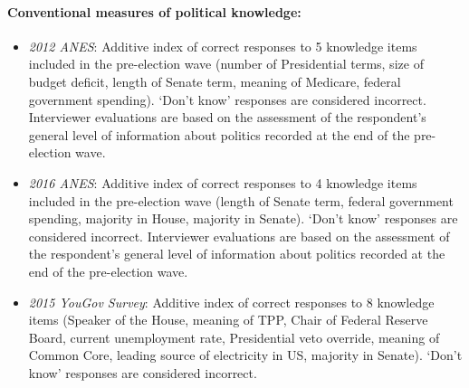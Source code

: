 \paragraph{Conventional measures of political knowledge:}
\begin{itemize}
\item \textit{2012 ANES}: Additive index of correct responses to 5 knowledge items included in the pre-election wave (number of Presidential terms, size of budget deficit, length of Senate term, meaning of Medicare, federal government spending). `Don't know' responses are considered incorrect. Interviewer evaluations are based on the assessment of the respondent's general level of information about politics recorded at the end of the pre-election wave.
\item \textit{2016 ANES}: Additive index of correct responses to 4 knowledge items included in the pre-election wave (length of Senate term, federal government spending, majority in House, majority in Senate). `Don't know' responses are considered incorrect. Interviewer evaluations are based on the assessment of the respondent's general level of information about politics recorded at the end of the pre-election wave.
\item \textit{2015 YouGov Survey}: Additive index of correct responses to 8 knowledge items (Speaker of the House, meaning of TPP, Chair of Federal Reserve Board, current unemployment rate, Presidential veto override, meaning of Common Core, leading source of electricity in US, majority in Senate). `Don't know' responses are considered incorrect.
\end{itemize}

